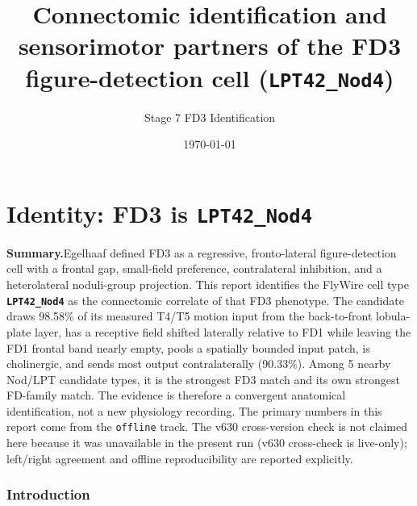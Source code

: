 \documentclass[11pt]{article}
\newcommand{\ttt}[1]{\texttt{#1}}
\begin{document}
\title{\textbf{Connectomic identification and sensorimotor partners of the FD3 figure-detection cell (\ttt{LPT42\_Nod4})}}

\author{Stage 7 FD3 Identification}

\date{\today}

\maketitle

\tableofcontents

\part{Identity: FD3 is \texttt{LPT42\_Nod4}}

\textbf{Summary.}\quad Egelhaaf defined FD3 as a regressive, fronto-lateral figure-detection cell with a frontal gap, small-field preference, contralateral inhibition, and a heterolateral noduli-group projection. This report identifies the FlyWire cell type \textbf{\ttt{LPT42\_Nod4}} as the connectomic correlate of that FD3 phenotype. The candidate draws 98.58\% of its measured T4/T5 motion input from the back-to-front lobula-plate layer, has a receptive field shifted laterally relative to FD1 while leaving the FD1 frontal band nearly empty, pools a spatially bounded input patch, is cholinergic, and sends most output contralaterally (90.33\%). Among 5 nearby Nod/LPT candidate types, it is the strongest FD3 match and its own strongest FD-family match. The evidence is therefore a convergent anatomical identification, not a new physiology recording. The primary numbers in this report come from the \ttt{offline} track. The v630 cross-version check is not claimed here because it was unavailable in the present run (v630 cross-check is live-only); left/right agreement and offline reproducibility are reported explicitly.

\section{Introduction}
\end{document}
